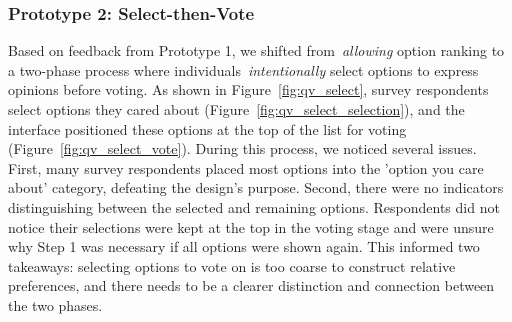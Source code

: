 \subsubsection{Prototype 2: Select-then-Vote}
Based on feedback from Prototype 1, we shifted from~\textit{allowing} option ranking to a two-phase process where individuals~\textit{intentionally} select options to express opinions before voting. As shown in Figure~\ref{fig:qv_select}, survey respondents select options they cared about (Figure~\ref{fig:qv_select_selection}), and the interface positioned these options at the top of the list for voting (Figure~\ref{fig:qv_select_vote}). During this process, we noticed several issues. First, many survey respondents placed most options into the 'option you care about' category, defeating the design's purpose. Second, there were no indicators distinguishing between the selected and remaining options. Respondents did not notice their selections were kept at the top in the voting stage and were unsure why Step 1 was necessary if all options were shown again. This informed two takeaways: selecting options to vote on is too coarse to construct relative preferences, and there needs to be a clearer distinction and connection between the two phases.

